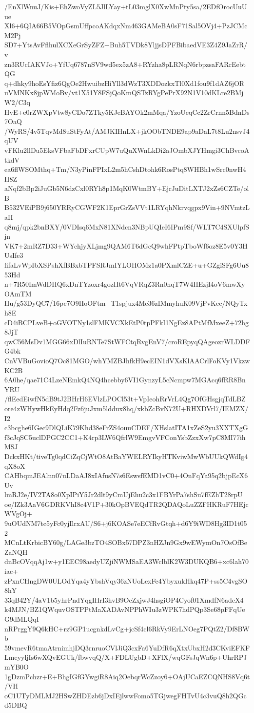 /EnXlWnuJ/Kis+EhZwoVyZL5JlLYay+tL03mglX0XwMnPty5sa/2EDfOrocUuUue
Xl6+6QIA66B5VOpGsmUffpcoAKdqxNm463GAMeBA0sF71Sal5OVj4+PzJCMcM2Pj
SD7+YtsAvFflhulXCXeGrSyZFZ+Buh5TVDk8YljjsDPFBibaedVE3Z4Z9JaZrR/v
zn3RUcIAKVJo+YfUq6787nSV9wd5ex5zA8+RYzha8pLRNqN6rbpzsaFARrEebtQG
q+dhky9hoEsYfiz6QgOe2HwuibzHiYll3dWzT3XDDozkxTl0Xd1fou9f1dAZ6jOR
uVMNKx8jpWMoBv/vt1X51Y8FSjQoKmQSTzRYgPePrX92N1V10dKLre2BMjW2/C3q
HvE+e0rZWXpVtw8yCDo7ZTky5KJeBAYOk2mMqa/YzoUeqCc2ZrCrnn5BdnDs7OaQ
/WyRS/4v5TqvMd8uStFyAt/AMJKIHnLX+jkOObTNDE9ap9aDaL7t8Lu2nsvJ4qUV
vFKlu2llDu5EksVFbaFbDFxrCUpW7uQuXWnLkDi2aJOmbXJYHmgi3ChBvcoAtkdV
ea6flWSOMthq+Tm/N3yPinFPIxL2m5hCshDtohk6RosPtq8WHBh1wSrc0nwH4H8Z
aNqf2bBp2iJuGb5N6dzCxl0RYh8p1MqK0WtmBY+EjrJuDitLXTJ2xZs6CZTe/olB
B532VEiPB9j650YRRyCGWF2K1EprGrZsVVt1LRYqhNkrvqgpx9Vin+9NVmtzLaII
q8mj/qpk2bnBXY/0VDIsq6MxN81XNdcn3NBpUQIeI6IPm9Sf/WLT7C4SXUlpfSjn
VK7+2mRZ7D33+WYchjyXLjmg9QAM6T6dGcQ9whFPtpTboWf6oz8E5v0Y3HUsIfe3
fifaLvWpIbXSPshXfBBxbTPFSRJmIYLOHOMz1a0PXmlCZE+u+GZgiSFg6Uu853Hd
n+7R50ImWdDHQ6xDnTYzoxr4gozHt6VqVRqZ3Rn0nqT7W4HEzjI4oV6mwXyOAmTM
Hu/g53DyQC7/16pc7O9HoOFtm+T1spjux4Mc36zIMmyhuK09VjPvKec/NQyTxh8E
cD4iBCPLveB+oGVOTNy1slFMKVCXkEtP0tpPFkI1NgEz8APtMfMxeeZ+72hg8JjT
qwC56MsDv1MGG66xDlIuRNTe7StWFCtqRvgEnV7/croREpyqQAgeozrWLDDFG4bk
CnVVBuGovioQ7Oc81MGO/whYMZBJhfkH9ecEIN1dVXsKlAACrlFoKVy1VkzwKC2B
6A0he/qae71C4LzeNEmkQ4NQ4hcebby6VI1GynzyL5cNcmpw7MGAcq6fRR8BnYRU
/flEedEiwfN5dB9tJ2BHrH6EVlzLPOCl53t+VpIeohRrVrL4Qg7OfGHsgjqTdLBZ
ore4zWHywHkEyHdq2Fz6juJxm5lddux8hq/xkbZcBvN72U+RHXDVrl7/IEMZX/I2
c3bcghe6IGec9DlQLiK79Khd38eFrZS4ouuCDEF/XHslatITA1xZeS2yu3XXTXgG
f3cJqSC5uclDPGC2CC1+K4rp3LW6QfrlW9EmgvVFConYsbZzxXw7pC8MI77ihMSJ
DckxHKt/tiveTg0qdCiZqCjWtO8AtBaYWELRYIkyHTKviwMwWbUUkQWdIg4qX8oX
CAHbqmJEAlnn07uLDaAJ8xIAfusN7s6EswsfEMD1vC0+4OnFqYa95q2bjpEcX6Uv
lmRJ2e/IV2TA8o0XpIPiY5Jr2dlt9yCmUjEhu2c3x1FBYrPa7shSu7fEZhT28rpU
oe/lZk3AaV6GDRKVhI8c4V1P+30kOpBVEQdTR2QDAQoLuZZFHKRuF7HEjcWVgOj+
9uOUdNM7tc5yFc0yjIlrxAU/S6+j6KOASe7eECfRvGtqh+d6Y9iWD8Hg3ID1t052
MCnLtKrbicBY60g/LAGe3bzTO4SOBx57DPZ3nHZJn9Gx9wEWymOn7OsOfBeZaNQH
dnBcOVqqAj1w+y1EEC98aedyUZjiNWMSaEA3WclblK2W3DUKQB6+xc6lah70iac+
zPxnCHngDW0ULOdYqa4yYbshVqy36zNUoLexFe4YbyxukHkq47P+ss5C4vgSO8hY
33qB42Y/4aV1b5yhrPndYqgIHrI3hvB9OcZxjwJ4hsgiOP4Cyof01XmdfN6adcX4
k4MJN/BZ1QWquvOSTPPtMaXADAvNPPhWIu3zWPK7hdPQp3Se68pFFqUeG9dMLQqI
nRPrggY9Q6kHC+rz9GP1ucgnkdLvCg+jcSf4cl6RkVy9ErLNOeg7PQtZ2/Df8BWb
59vmevR6tmaAtrnimhjDQ3rnruoCVlJiQ3cxFa6YuDfR6qXtxUbxH2d3CKviEFKF
LmeyyljIs6wXQvEGUk/fbwvqQ/X+FDLUgbD+XFlX/wqGFsJqWn6p+UhrRPJmYB0O
1gDzmPchzr+E+BhgIGfGYwgiR8Aiq2OebqrWcZzoy6+OAjUCaEZCQNHS8Vq6t/VH
oC1UTyDMLMJ2HSwZHDEzb6jDxIEjlwwFomo5TGjwegFHTvU4c3vuQ8h2QGcd5DBQ
